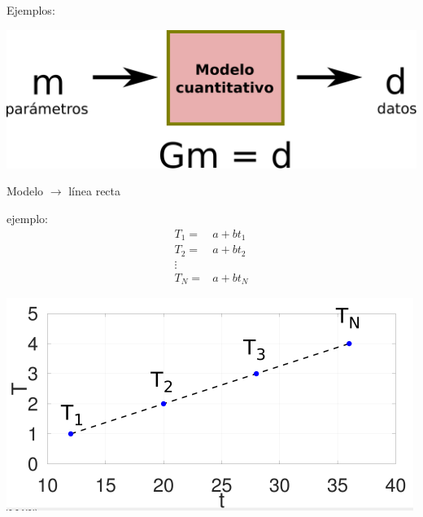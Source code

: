 \documentclass{beamer}
\begin{document}
\begin{frame}
 {Ejemplos:}
 
 \begin{center}
  \includegraphics[width=0.6\linewidth]{images/forward.pdf}  
 \end{center}
 \begin{minipage}{0.45\linewidth}
 \begin{center}
  Modelo $\rightarrow$ línea recta \\
 \end{center}
 ejemplo:
 \begin{align*}
  T_1 = & a + bt_1 \\
  T_2 = & a + bt_2 \\
  \vdots \\
  T_N = & a  + bt_N
 \end{align*}
 \end{minipage}
 \begin{minipage}{0.45\linewidth}
  \includegraphics[width=1\linewidth]{images/line.png}
 \end{minipage}
 
\end{frame}
\end{document}
